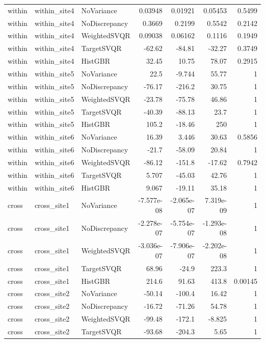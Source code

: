 \begin{longtable}{lllrrrr}
within & within\_site4 & NoVariance & 0.03948 & 0.01921 & 0.05453 & 0.5499 \\
within & within\_site4 & NoDiscrepancy & 0.3669 & 0.2199 & 0.5542 & 0.2142 \\
within & within\_site4 & WeightedSVQR & 0.09038 & 0.06162 & 0.1116 & 0.1949 \\
within & within\_site4 & TargetSVQR & -62.62 & -84.81 & -32.27 & 0.3749 \\
within & within\_site4 & HistGBR & 32.45 & 10.75 & 78.07 & 0.2915 \\
within & within\_site5 & NoVariance & 22.5 & -9.744 & 55.77 & 1 \\
within & within\_site5 & NoDiscrepancy & -76.17 & -216.2 & 30.75 & 1 \\
within & within\_site5 & WeightedSVQR & -23.78 & -75.78 & 46.86 & 1 \\
within & within\_site5 & TargetSVQR & -40.39 & -88.13 & 23.7 & 1 \\
within & within\_site5 & HistGBR & 105.2 & -18.46 & 250 & 1 \\
within & within\_site6 & NoVariance & 16.39 & 3.446 & 30.63 & 0.5856 \\
within & within\_site6 & NoDiscrepancy & -21.7 & -58.09 & 20.84 & 1 \\
within & within\_site6 & WeightedSVQR & -86.12 & -151.8 & -17.62 & 0.7942 \\
within & within\_site6 & TargetSVQR & 5.707 & -45.03 & 42.76 & 1 \\
within & within\_site6 & HistGBR & 9.067 & -19.11 & 35.18 & 1 \\
cross & cross\_site1 & NoVariance & -7.577e-08 & -2.065e-07 & 7.319e-09 & 1 \\
cross & cross\_site1 & NoDiscrepancy & -2.278e-07 & -5.754e-07 & -1.293e-08 & 1 \\
cross & cross\_site1 & WeightedSVQR & -3.036e-07 & -7.906e-07 & -2.202e-08 & 1 \\
cross & cross\_site1 & TargetSVQR & 68.96 & -24.9 & 223.3 & 1 \\
cross & cross\_site1 & HistGBR & 214.6 & 91.63 & 413.8 & 0.00145 \\
cross & cross\_site2 & NoVariance & -50.14 & -100.4 & 16.42 & 1 \\
cross & cross\_site2 & NoDiscrepancy & -16.72 & -71.26 & 54.78 & 1 \\
cross & cross\_site2 & WeightedSVQR & -99.48 & -172.1 & -8.825 & 1 \\
cross & cross\_site2 & TargetSVQR & -93.68 & -204.3 & 5.65 & 1 \\

\end{longtable}
